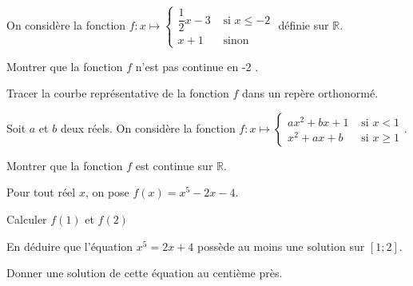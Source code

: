 \documentclass[11pt,a4paper]{article}  %
\begin{document}
\exerciceDS{}

On considère la fonction $f: x \mapsto\left\{\begin{array}{ll}\dfrac{1}{2} x-3 & \text { si } x \leqslant-2 \\ x+1 & \text { sinon }\end{array}\right.$ définie sur $\mathbb{R}$.
\begin{enumMet}
	\item Montrer que la fonction $f$ n'est pas continue en -2 .
	\item Tracer la courbe représentative de la fonction $f$ dans un repère orthonormé.
\end{enumMet}



\exerciceDS{}

Soit $a$ et $b$ deux réels. On considère la fonction $f: x \mapsto\left\{\begin{array}{ll}a x^2+b x+1 & \text { si } x<1 \\ x^2+a x+b & \text { si } x \geqslant 1\end{array}\right.$.

Montrer que la fonction $f$ est continue sur $\mathbb{R}$.

%

\exerciceDS{}

Pour tout réel $x$, on pose $f(x)=x^5-2 x-4$.
\begin{enumMet}
	\item Calculer $f(1)$ et $f(2)$
	\item En déduire que l'équation $x^5=2 x+4$ possède au moins une solution sur $[1 ; 2]$.
	\item Donner une solution de cette équation au centième près.
\end{enumMet}

%
\end{document}

